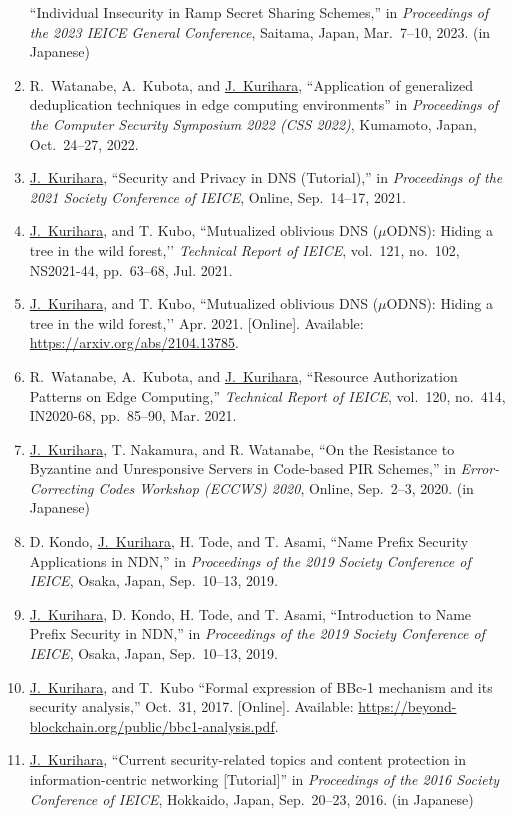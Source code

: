 \begin{enumerate}
       ``Individual Insecurity in Ramp Secret Sharing Schemes,''
       in \textit{Proceedings of the 2023 IEICE General Conference},
       Saitama, Japan, Mar.~7--10, 2023. (in Japanese)
 \item R.~Watanabe, A.~Kubota, and \underline{J.~Kurihara}, ``Application of generalized deduplication techniques in edge computing environments'' in \textit{Proceedings of the Computer Security Symposium 2022 (CSS 2022)}, Kumamoto, Japan, Oct.~24--27, 2022.
 \item \underline{J.~Kurihara}, ``Security and Privacy in DNS (Tutorial),'' in \textit{Proceedings of the 2021 Society Conference of IEICE}, Online, Sep.~14--17, 2021.
 \item \underline{J.~Kurihara}, and T. Kubo, ``Mutualized oblivious DNS ($\mu$ODNS): Hiding a tree in the wild forest,’’ \textit{Technical Report of IEICE}, vol.~121, no.~102, NS2021-44, pp.~63--68, Jul. 2021.
 \item \underline{J.~Kurihara}, and T. Kubo, ``Mutualized oblivious DNS ($\mu$ODNS): Hiding a tree in the wild forest,’’ Apr. 2021. [Online]. Available: \url{https://arxiv.org/abs/2104.13785}.
\item R.~Watanabe, A.~Kubota, and \underline{J.~Kurihara}, ``Resource Authorization Patterns on Edge Computing,'' \textit{Technical Report of IEICE}, vol.~120, no.~414, IN2020-68, pp.~85--90, Mar. 2021.
 \item \underline{J.~Kurihara}, T. Nakamura, and R. Watanabe, ``On the Resistance to Byzantine and Unresponsive Servers in Code-based PIR Schemes,'' in \textit{Error-Correcting Codes Workshop (ECCWS) 2020}, Online, Sep.~2--3, 2020. (in Japanese)
 \item D. Kondo, \underline{J.~Kurihara}, H. Tode, and T. Asami, ``Name Prefix Security Applications in NDN,'' in \textit{Proceedings of the 2019 Society Conference of IEICE}, Osaka, Japan, Sep.~10--13, 2019.
 \item \underline{J.~Kurihara}, D. Kondo, H. Tode, and T. Asami, ``Introduction to Name Prefix Security in NDN,'' in \textit{Proceedings of the 2019 Society Conference of IEICE}, Osaka, Japan, Sep.~10--13, 2019.
 \item \underline{J.~Kurihara}, and T.~Kubo ``Formal expression of BBc-1 mechanism and its security analysis,'' Oct.~31, 2017. [Online]. Available: \url{https://beyond-blockchain.org/public/bbc1-analysis.pdf}.
 \item \underline{J.~Kurihara}, ``Current security-related topics and content protection in information-centric networking [Tutorial]'' in \textit{Proceedings of the 2016 Society Conference of IEICE}, Hokkaido, Japan, Sep.~20--23, 2016. (in Japanese)

\end{enumerate}
